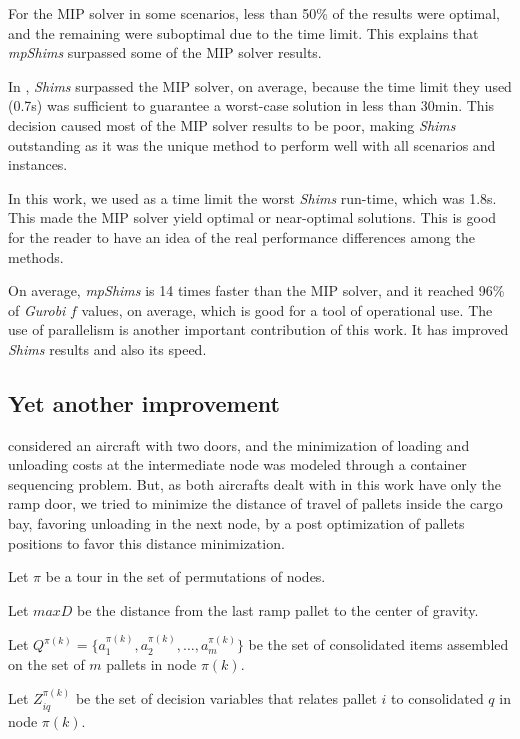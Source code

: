 \documentclass[preprint,authoryear]{elsarticle}
\begin{document}
For the MIP solver in some scenarios, less than 50\% of the results were optimal, and the remaining were suboptimal due to the time limit. This explains that {\it mpShims} surpassed some of the MIP solver results. 

In \cite{MesquitaSanches2023}, {\it Shims} surpassed the MIP solver, on average, because the time limit they used (0.7s) was sufficient to guarantee a worst-case solution in less than 30min. This decision caused most of the MIP solver results to be poor, making {\it Shims} outstanding as it was the unique method to perform well with all scenarios and instances.

In this work, we used as a time limit the worst {\it Shims} run-time, which was 1.8s. This made the MIP solver yield optimal or near-optimal solutions. This is good for the reader to have an idea of the real performance differences among the methods.

On average, {\it mpShims} is 14 times faster than the MIP solver, and it reached 96\% of {\it Gurobi} $f$ values, on average, which is good for a tool of operational use. The use of parallelism is another important contribution of this work. It has improved {\it Shims} results and also its speed.


\subsection{Yet another improvement}

\cite{LurkinSchyns2015} considered an aircraft with two doors, and the minimization of loading and unloading costs at the intermediate node was modeled through a container sequencing problem. But, as both aircrafts dealt with in this work have only the ramp door, we tried to minimize the distance of travel of pallets inside the cargo bay, favoring unloading in the next node, by a post optimization of pallets positions to favor this distance minimization.

Let $\pi$ be a tour in the set of permutations of nodes.

Let $maxD$ be the distance from the last ramp pallet to the center of gravity.

Let $Q^{\pi(k)}  = \{ a^{\pi(k)}_1, a^{\pi(k)}_2, \ldots, a^{\pi(k)}_m \}$ be the set of consolidated items assembled on the set of $m$ pallets in node $\pi(k)$.

Let $Z^{\pi(k)}_{iq}$ be the set of decision variables that relates pallet $i$ to consolidated $q$ in node $\pi(k)$.
\end{document}
